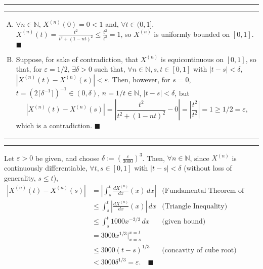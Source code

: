 \documentclass[11pt]{article}
\newcounter{questionCounter}
\newcounter{partCounter}[questionCounter]
\newenvironment{question}[2][\arabic{questionCounter}]{%
    \setcounter{partCounter}{0}%
    \vspace{.25in} \hrule \vspace{0.5em}%
        \noindent{\bf #2}%
    \vspace{0.8em} \hrule \vspace{.10in}%
    \addtocounter{questionCounter}{1}%
}{}
\renewcommand{\qed}{\quad $\blacksquare$}
\newcommand{\mqed}{\quad \blacksquare}
\newcommand{\inv}{^{-1}}
\newcommand{\N}{\mathbb{N}} %
\newcommand{\e}{\varepsilon} %
\begin{document}
\newpage
\begin{question}{Problem 4}
\begin{enumerate}[A)]
\item $\forall n \in \N$, $X^{(n)}(0) = 0 < 1$ and, $\forall t \in (0,1]$,
$X^{(n)}(t)
 =    \frac{t^2}{t^2 + (1 - nt)^2}
 \leq \frac{t^2}{t^2}
 = 1$,
so $X^{(n)}$ is uniformly bounded on $[0,1]$. \qed

\item Suppose, for sake of contradiction, that $X^{(n)}$ is equicontinuous on
$[0,1]$, so that, for $\e = 1/2$, $\exists \delta > 0$ such that,
$\forall n \in \N, s,t \in [0,1]$ with $|t - s| < \delta$,
$|X^{(n)}(t) - X^{(n)}(s)| < \e$. Then, however, for $s = 0$,
$t = \left( 2\lceil \delta\inv \rceil \right)\inv \in (0,\delta)$, $n = 1/t \in
\N$, $|t - s| < \delta$, but
\[|X^{(n)}(t) - X^{(n)}(s)|
 = \left| \frac{t^2}{t^2 + (1 - nt)^2} - 0 \right|
 = \left| \frac{t^2}{t^2} \right|
 = 1 \geq 1/2 = \e,
\]
which is a contradiction. \qed
\end{enumerate}
\end{question}

\begin{question}{Problem 5}
Let $\e > 0$ be given, and choose $\delta := \left( \frac{\e}{3000} \right)^3$.
Then, $\forall n \in \N$, since $X^{(n)}$ is continuously differentiable,
$\forall t,s \in [0,1]$ with $|t - s| < \delta$ (without loss of generality,
$s \leq t$),
\begin{align*}
\left| X^{(n)}(t) - X^{(n)}(s) \right|
 & =    \left| \int_s^t \frac{dX^{(n)}}{dx}(x) \, dx \right|
 & \mbox{(Fundamental Theorem of Calculus)} \\
 & \leq \int_s^t \left| \frac{dX^{(n)}}{dx}(x) \right| \, dx
 & \mbox{(Triangle Inequality)} \\
 & \leq \int_s^t 1000x^{-2/3} \, dx
 & \mbox{(given bound)} \\
 & =    3000x^{1/3} \bigg|_{x = s}^{x = t} \\
 & \leq 3000(t - s)^{1/3}
 & \mbox{(concavity of cube root)} \\
 &  <   3000\delta^{1/3}
   = \e. \mqed
\end{align*}
\end{question}
\end{document}
